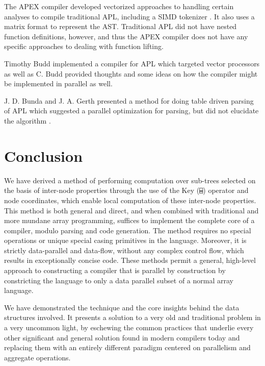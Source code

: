 \documentclass[numbers,preprint]{sigplanconf}
\begin{document}
The APEX compiler \cite{bernecky1997apex} developed vectorized approaches to handling
certain analyses to compile traditional APL, including a SIMD tokenizer
\cite{bernecky2003tokenizer}.
It also uses 
a matrix format to represent the AST. Traditional APL did not have
nested function definitions, however, and thus the APEX compiler does
not have any specific approaches to dealing with function lifting.

Timothy Budd implemented a compiler \cite{budd1984apl,budd2012apl} for APL which targeted
vector processors as well as C. Budd provided 
thoughts and some ideas on how the compiler might be implemented in
parallel as well.

J. D. Bunda and J. A. Gerth presented a method for doing table driven
parsing of APL which suggested a parallel optimization for parsing,
but did not elucidate the algorithm \cite{bunda1984apl}.

\section{Conclusion}

We have derived a method of performing computation over sub-trees
selected on the basis of inter-node properties through the use of the
Key (\verb;⌸;) operator and node coordinates, which enable local computation
of these inter-node properties. This method is both general and direct,
and when combined with traditional and more mundane array programming,
suffices to implement the complete core of a compiler, modulo parsing
and code generation. The method requires no special operations or
unique special casing primitives in the language. Moreover, it is
strictly data-parallel and data-flow, without any complex control flow,
which results in exceptionally concise code. These methods permit a 
general, high-level approach to constructing a compiler that is 
parallel by construction by constricting the language to only a data parallel 
subset of a normal array language. 

We have demonstrated the technique and the core insights behind the
data structures involved. It presents a solution to a very old and
traditional problem in a very uncommon light, by eschewing the common
practices that underlie every other significant and general solution
found in modern compilers today and replacing them with an entirely
different paradigm centered on parallelism and aggregate operations.



\end{document}
